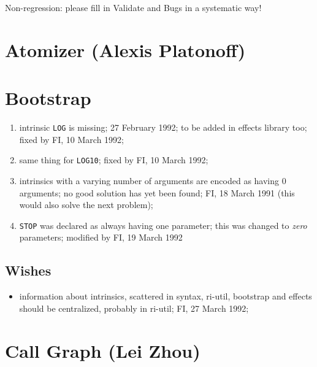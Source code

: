 Non-regression: please fill in Validate and Bugs in a systematic way!

\section{Atomizer (Alexis Platonoff)}

\section{Bootstrap}

\begin{enumerate}

  \item intrinsic \verb+LOG+ is missing; 27 February 1992; to be added
        in effects library too; fixed by FI, 10 March 1992;

  \item same thing for \verb+LOG10+; fixed by FI, 10 March 1992;

  \item intrinsics with a varying number of arguments are encoded
        as having 0 arguments; no good solution has yet been found;
        FI, 18 March 1991 (this would also solve the next problem);

  \item \verb+STOP+ was declared as always having one parameter;
        this was changed to {\em zero} parameters; modified by
        FI, 19 March 1992

\end{enumerate}


\subsection{Wishes}

\begin{itemize}

  \item information about intrinsics, scattered in syntax, ri-util,
        bootstrap and effects should be centralized, probably in
        ri-util; FI, 27 March 1992;

\end{itemize}

\section{Call Graph (Lei Zhou)}

